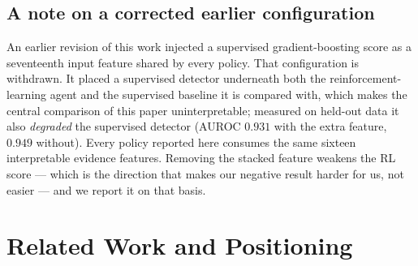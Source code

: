 \documentclass[conference]{IEEEtran}
\begin{document}
\subsection{A note on a corrected earlier configuration}
\label{sec:correction}

An earlier revision of this work injected a supervised gradient-boosting score
as a seventeenth input feature shared by every policy. That configuration is
withdrawn. It placed a supervised detector underneath both the
reinforcement-learning agent and the supervised baseline it is compared with,
which makes the central comparison of this paper uninterpretable; measured on
held-out data it also \emph{degraded} the supervised detector
(AUROC $0.931$ with the extra feature, $0.949$ without). Every policy reported
here consumes the same sixteen interpretable evidence features. Removing the
stacked feature weakens the RL score --- which is the direction that makes our
negative result harder for us, not easier --- and we report it on that basis.

\section{Related Work and Positioning}
\label{sec:related}
\end{document}
